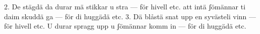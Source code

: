 2.  De stägdä da durar mä stikkar u stra — för hivell etc.
    att intä ʃömännar ti daim skuddä ga — för di huggädä etc.
3.  Dä blåstä snat upp en syvästeli vinn — för hivell etc.
    U durar spragg upp u ʃömännar komm in — för di huggädä etc.
